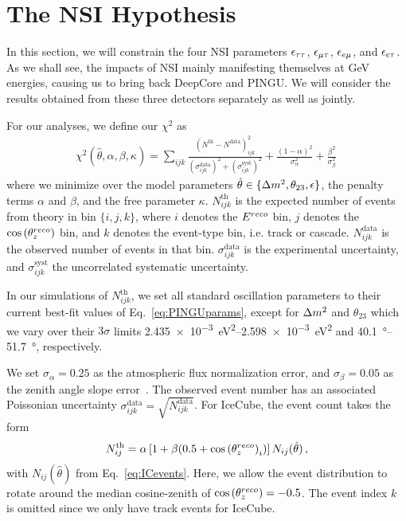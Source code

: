 \section{The NSI Hypothesis}\label{sec:constraining}
In this section, we will constrain the four NSI parameters $\epsilon_{\tau\tau}$, $\epsilon_{\mu\tau}$, $\epsilon_{e\mu}$, and $\epsilon_{e\tau}$. As we shall see, the impacts of NSI mainly manifesting 
themselves at \si{\GeV} energies, causing us to bring back DeepCore and PINGU. We will consider the results obtained from these three detectors separately as well as jointly.

For our analyses, we define our $\chi^2$ as
\begin{align}\label{eq:chisq_NSI}
    \chi^{2}(\hat{\theta},\alpha,\beta, \kappa)=\sum_{ijk} \frac{\left(N^\text{th}-N^\text{data}\right)_{ijk}^{2}}
    {\left(\sigma^\text{data}_{ijk}\right)^{2} + \left(\sigma^\text{syst}_{ijk}\right)^{2}}+ 
    \frac{(1-\alpha)^2}{\sigma_\alpha^2} + \frac{\beta^2}{\sigma_\beta^2}\,
\end{align}
where we minimize over the model parameters $\hat{\theta} \in \{\dm, \theta_{23}, \epsilon\}$, the penalty terms $\alpha$ and $\beta$, and the free parameter $\kappa$.
$N_{ijk}^\text{th}$ is the expected number of events from theory in bin $\{i,j,k\}$, where $i$ denotes the $E^{reco}$ bin, $j$ denotes the $\cos{(\theta_z^{reco})}$ bin,
and $k$ denotes the event-type bin, i.e. track or cascade. 
$N_{ijk}^\text{data}$ is the observed number of events in that bin. $\sigma^\text{data}_{ijk}$ is the experimental uncertainty, and $\sigma^\text{syst}_{ijk}$ the uncorrelated systematic
uncertainty.

In our simulations of $N_{ijk}^\text{th}$, we set all standard oscillation parameters to their current best-fit values of Eq.~\ref{eq:PINGUparams}, 
except for $\dm$ and $\theta_{23}$
which we vary over their $3\sigma$ limits \SIrange{2.435e-3}{2.598e-3}{\eV\squared} and \SIrange{40.1}{51.7}{\degree}, respectively.

We set $\sigma_\alpha = 0.25$ as the atmospheric flux normalization error, and $\sigma_\beta = 0.05$ as the zenith angle slope error~\cite{hondapaper}. 
The observed event number has an associated Poissonian uncertainty $\sigma_{ijk}^\text{data} = \sqrt{N_{ijk}^\text{data}}$.
For IceCube, the event count takes the form
\begin{align}
    N^\text{th}_{ij} = \alpha\left[1+\beta (0.5 + \cos{(\theta_z^{reco})}_i )\right] N_{ij}(\hat{\theta})\,,
\end{align}
with $N_{ij}(\hat{\theta})$ from Eq.~\ref{eq:ICevents}. Here, we allow the event distribution to rotate around the median cosine-zenith of $\cos{(\theta_z^{reco})} = -0.5$. 
The event index $k$ is omitted since we only have track events for IceCube.

